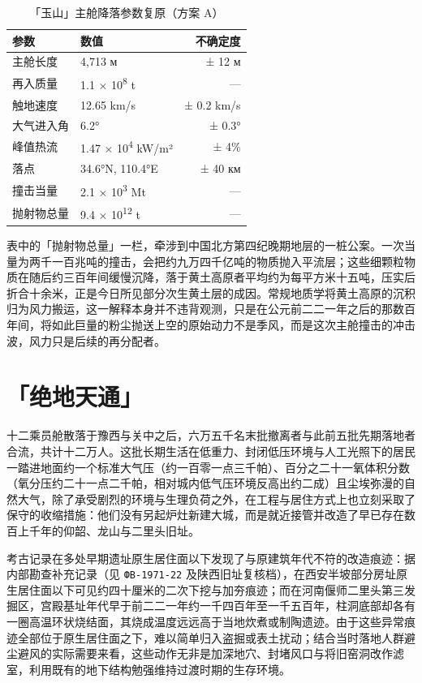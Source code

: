 \begin{table}[htbp]
  \centering
  \caption{「玉山」主舱降落参数复原（方案 A）}
  \label{tab:landing}
  \footnotesize
  \begin{tabular}{@{}llr@{}}
    \toprule
    参数 & 数值 & 不确定度 \\
    \midrule
    主舱长度 & 4{,}713 м & ± 12 м \\
    再入质量 & 1.1 × 10\textsuperscript{8} t & — \\
    触地速度 & 12.65 km/s & ± 0.2 km/s \\
    大气进入角 & 6.2° & ± 0.3° \\
    峰值热流 & 1.47 × 10\textsuperscript{4} kW/m² & ± 4\% \\
    落点 & 34.6°N, 110.4°E & ± 40 км \\
    撞击当量 & 2.1 × 10\textsuperscript{3} Mt & — \\
    抛射物总量 & 9.4 × 10\textsuperscript{12} t & — \\
    \bottomrule
  \end{tabular}
\end{table}

表中的「抛射物总量」一栏，牵涉到中国北方第四纪晚期地层的一桩公案。一次当量为两千一百兆吨的撞击，会把约九万四千亿吨的物质抛入平流层；这些细颗粒物质在随后约三百年间缓慢沉降，落于黄土高原者平均约为每平方米十五吨，压实后折合十余米，正是今日所见部分次生黄土层的成因。常规地质学将黄土高原的沉积归为风力搬运，这一解释本身并不违背观测，只是在公元前二二一年之后的那数百年间，将如此巨量的粉尘抛送上空的原始动力不是季风，而是这次主舱撞击的冲击波，风力只是后续的再分配者。

\section{「绝地天通」}

十二乘员舱散落于豫西与关中之后，六万五千名末批撤离者与此前五批先期落地者合流，共计十二万人。这批长期生活在低重力、封闭低压环境与人工光照下的居民一踏进地面约一个标准大气压（约一百零一点三千帕）、百分之二十一氧体积分数（氧分压约二十一点二千帕，相对城内低气压环境反高出约二成）且尘埃弥漫的自然大气，除了承受剧烈的环境与生理负荷之外，在工程与居住方式上也立刻采取了保守的收缩措施：他们没有另起炉灶新建大城，而是就近接管并改造了早已存在数百上千年的仰韶、龙山与二里头旧址。

考古记录在多处早期遗址原生居住面以下发现了与原建筑年代不符的改造痕迹：据内部勘查补充记录（见 \texttt{ФВ-1971-22} 及陕西旧址复核档），在西安半坡部分房址原生居住面以下可见约四十厘米的二次下挖与加夯痕迹；而在河南偃师二里头第三发掘区，宫殿基址年代早于前二二一年约一千四百年至一千五百年，柱洞底部却各有一圈高温环状烧结面，其烧成温度远远高于当地炊煮或制陶遗迹。由于这些异常痕迹全部位于原生居住面之下，难以简单归入盗掘或表土扰动；结合当时落地人群避尘避风的实际需要来看，这些动作无非是加深地穴、封堵风口与将旧窑洞改作滤室，利用既有的地下结构勉强维持过渡时期的生存环境。


